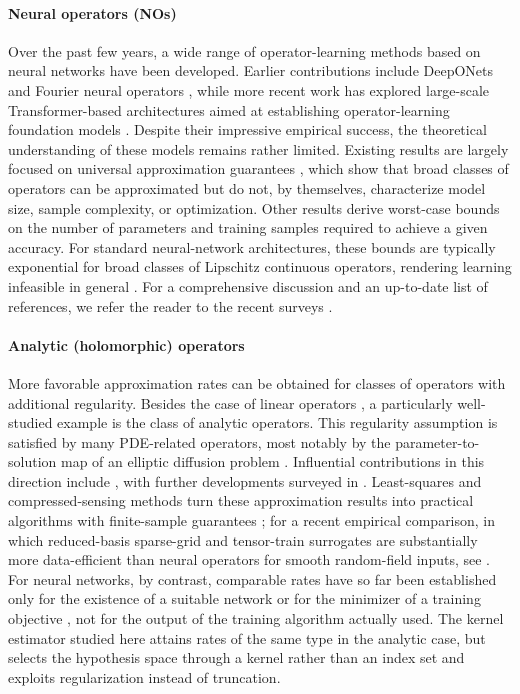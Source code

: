 \documentclass[11pt]{article}
\numberwithin{equation}{section}
\theoremstyle{plain}
\theoremstyle{definition}
\theoremstyle{remark}
\begin{document}
\paragraph{Neural operators (NOs)}
Over the past few years, a wide range of operator-learning methods based on
neural networks have been developed. Earlier contributions include DeepONets
\cite{lu2021learning} and Fourier neural operators
\cite{li2020fourier}, while more recent work has explored large-scale
Transformer-based architectures aimed at establishing operator-learning
foundation models
\cite{hao2024dpot, herde2024poseidon, alkin2024universal}. Despite their
impressive empirical success, the theoretical understanding of these models
remains rather limited. Existing results are largely focused on universal
approximation guarantees \cite{kovachki2024operator, lanthaler2025nonlocality},
which show that broad classes of operators can be approximated but do not, by
themselves, characterize model size, sample complexity, or optimization.
Other results derive worst-case bounds on the number of parameters and
training samples required to achieve a given accuracy. For standard
neural-network architectures, these bounds are typically exponential for
broad classes of Lipschitz continuous operators, rendering learning infeasible
in general \cite{liu2024deep}. For a comprehensive discussion and an
up-to-date list of references, we refer the reader to the recent surveys
\cite{lanthaler2024error, subedi2025operator}.

\paragraph{Analytic (holomorphic) operators}
More favorable approximation rates can be obtained for classes of operators
with additional regularity. Besides the case of linear operators
\cite{de2023convergence}, a particularly well-studied example is the class of
analytic operators. This regularity assumption is satisfied by many
PDE-related operators, most notably by the parameter-to-solution map of an
elliptic diffusion problem \cite{cohen2015approximation}. Influential
contributions in this direction include
\cite{cohen2010convergence, cohen2011analytic}, with further developments
surveyed in \cite{cohen2015approximation, adcock2022sparse, adcock2024learning,
adcock2024optimal}. Least-squares and compressed-sensing methods turn these
approximation results into practical algorithms with finite-sample guarantees
\cite{chkifa2015discrete, adcock2024efficient}; for a recent empirical comparison,
in which reduced-basis sparse-grid and tensor-train surrogates are substantially
more data-efficient than neural operators for smooth random-field inputs, see
\cite{westermann2026performance}. For neural
networks, by contrast, comparable rates have so far been established only for
the existence of a suitable network \cite{opschoor2022exponential, herrmann2024neural}
or for the minimizer of a training objective
\cite{adcock2024learning, adcock2024optimal}, not for the output of the training
algorithm actually used. The kernel estimator studied here
attains rates of the same type in the analytic case, but selects the hypothesis
space through a kernel rather than an index set and exploits regularization instead of
truncation.
\end{document}
